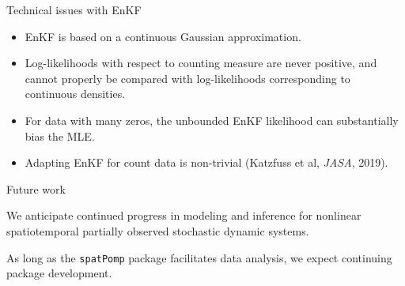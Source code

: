\documentclass{beamer}
\begin{document}
\begin{frame}{Technical issues with EnKF}

  \begin{itemize}
  \item EnKF is based on a continuous Gaussian approximation.
  \item Log-likelihoods with respect to counting measure are never positive, and cannot properly be compared with log-likelihoods corresponding to continuous densities.
    \item For data with many zeros, the unbounded EnKF likelihood can substantially bias the MLE.
    \item Adapting EnKF for count data is non-trivial (Katzfuss et al, {\it JASA}, 2019).
  \end{itemize}
  
  \end{frame}

\begin{frame}{Future work}

  \newcommand\futuresep{\vspace{5mm}}
  
  \begin{myitemize}

  \item We anticipate continued progress in modeling and inference for nonlinear spatiotemporal partially observed stochastic dynamic systems.

    \futuresep
    
  \item As long as the \texttt{spatPomp} package facilitates data analysis, we expect continuing package development.


    
\end{myitemize}

\end{frame}
\end{document}
